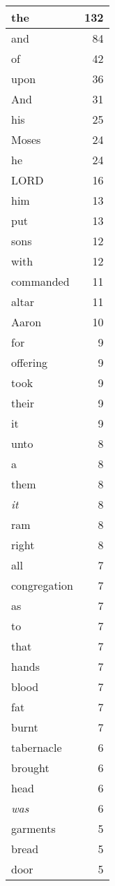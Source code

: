 \begin{center}
\begin{longtable}{l|r}
\hline \hline
\endlastfoot
the & 132 \\ \hline
and & 84 \\ \hline
of & 42 \\ \hline
upon & 36 \\ \hline
And & 31 \\ \hline
his & 25 \\ \hline
Moses & 24 \\ \hline
he & 24 \\ \hline
LORD & 16 \\ \hline
him & 13 \\ \hline
put & 13 \\ \hline
sons & 12 \\ \hline
with & 12 \\ \hline
commanded & 11 \\ \hline
altar & 11 \\ \hline
Aaron & 10 \\ \hline
for & 9 \\ \hline
offering & 9 \\ \hline
took & 9 \\ \hline
their & 9 \\ \hline
it & 9 \\ \hline
unto & 8 \\ \hline
a & 8 \\ \hline
them & 8 \\ \hline
\emph{it} & 8 \\ \hline
ram & 8 \\ \hline
right & 8 \\ \hline
all & 7 \\ \hline
congregation & 7 \\ \hline
as & 7 \\ \hline
to & 7 \\ \hline
that & 7 \\ \hline
hands & 7 \\ \hline
blood & 7 \\ \hline
fat & 7 \\ \hline
burnt & 7 \\ \hline
tabernacle & 6 \\ \hline
brought & 6 \\ \hline
head & 6 \\ \hline
\emph{was} & 6 \\ \hline
garments & 5 \\ \hline
bread & 5 \\ \hline
door & 5 \\ \hline

\end{longtable}
\end{center}

